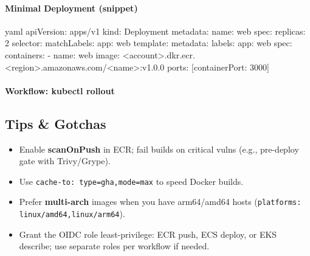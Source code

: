 \documentclass[11pt]{article}
\begin{document}
\paragraph{Minimal Deployment (snippet)}
\begin{code}{yaml}
apiVersion: apps/v1
kind: Deployment
metadata:
  name: web
spec:
  replicas: 2
  selector: { matchLabels: { app: web } }
  template:
    metadata: { labels: { app: web } }
    spec:
      containers:
      - name: web
        image: <account>.dkr.ecr.<region>.amazonaws.com/<name>:v1.0.0
        ports: [{containerPort: 3000}]
\end{code}

\paragraph{Workflow: kubectl rollout}

\subsection{Tips \& Gotchas}
\begin{itemize}
  \item Enable \textbf{scanOnPush} in ECR; fail builds on critical vulns (e.g., pre-deploy gate with Trivy/Grype).
  \item Use \texttt{cache-to: type=gha,mode=max} to speed Docker builds.
  \item Prefer \textbf{multi-arch} images when you have arm64/amd64 hosts (\texttt{platforms: linux/amd64,\allowbreak linux/arm64}).
  \item Grant the OIDC role least-privilege: ECR push, ECS deploy, or EKS describe; use separate roles per workflow if needed.
\end{itemize}
\end{document}

